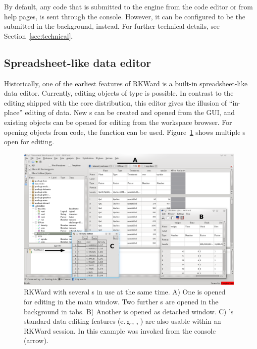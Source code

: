 By default, any code that is submitted to the
 engine from the code editor or from help
pages, is sent through the  console.
However, it can be configured to be the submitted in the background,
instead.
For further technical details, see Section~\ref{sec:technical}.

\subsection{Spreadsheet-like data editor}
\label{sec:spreadsheet}

Historically, one of the earliest
features of RKWard is a built-in spreadsheet-like data editor.
Currently, editing  objects of type
 is possible. In contrast to the  editing shipped
with the  core distribution, this editor
gives the illusion of ``in-place'' editing of data. New s can
be created and opened from the GUI, and existing objects can be opened
for editing from the workspace browser. For opening objects from
 code, the function  can be used.
Figure~\ref{fig:data_editors} shows multiple s open for editing.

\begin{figure}[b!]
 \centering
 \includegraphics[width=15.5cm]{../figures/data_editors.png}
 \caption{RKWard with several s in use at the same time. A) 
  One  is opened for editing in the main window. Two further s
  are opened in the background in tabs. 
  B) Another  is opened as detached window. 
  C) 's standard data editing features (e.\,g., , ) 
  are also usable within an RKWard session. In this example  
  was invoked from the console (arrow).}
 \label{fig:data_editors}
\end{figure}

